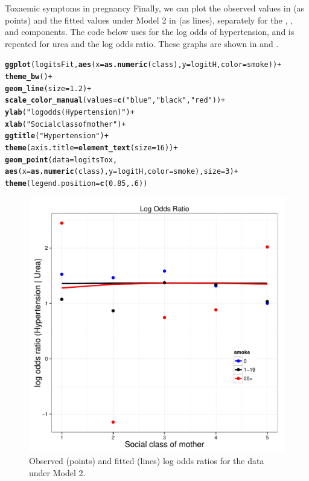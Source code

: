 \documentclass[11pt]{book}\usepackage[]{graphicx}\usepackage[]{color}
\makeatletter
\newcommand{\hlnum}[1]{\textcolor[rgb]{0.686,0.059,0.569}{#1}}%
\newcommand{\hlstr}[1]{\textcolor[rgb]{0.192,0.494,0.8}{#1}}%
\newcommand{\hlopt}[1]{\textcolor[rgb]{0,0,0}{#1}}%
\newcommand{\hlstd}[1]{\textcolor[rgb]{0.345,0.345,0.345}{#1}}%
\newcommand{\hlkwc}[1]{\textcolor[rgb]{0.333,0.667,0.333}{#1}}%
\newcommand{\hlkwd}[1]{\textcolor[rgb]{0.737,0.353,0.396}{\textbf{#1}}}%
\newenvironment{kframe}{%
 \def\at@end@of@kframe{}%
 \ifinner\ifhmode%
  \def\at@end@of@kframe{\end{minipage}}%
  \begin{minipage}{\columnwidth}%
 \fi\fi%
 \def\FrameCommand##1{\hskip\@totalleftmargin \hskip-\fboxsep
 \colorbox{shadecolor}{##1}\hskip-\fboxsep
     \hskip-\linewidth \hskip-\@totalleftmargin \hskip\columnwidth}%
 \MakeFramed {\advance\hsize-\width
   \@totalleftmargin\z@ \linewidth\hsize
   \@setminipage}}%
 {\par\unskip\endMakeFramed%
 \at@end@of@kframe}
\newenvironment{knitrout}{}{} %
\renewenvironment{knitrout}{\small\renewcommand{\baselinestretch}{.85}}{} %
\makeatother
\begin{document}
\begin{Example}[toxaemia]{Toxaemic symptoms in pregnancy}
Finally, we can plot the observed values in  (as points) and the
fitted values under Model 2 in  (as lines),
separately for the , , and  components.
The code below uses  for the log odds of hypertension,
and is repeated for urea and the log odds ratio.
These graphs are shown in  and .
\begin{knitrout}
\color{fgcolor}\begin{kframe}
\begin{alltt}
\hlkwd{ggplot}\hlstd{(logitsFit,} \hlkwd{aes}\hlstd{(}\hlkwc{x}\hlstd{=}\hlkwd{as.numeric}\hlstd{(class),} \hlkwc{y}\hlstd{=logitH,} \hlkwc{color}\hlstd{=smoke))} \hlopt{+}
  \hlkwd{theme_bw}\hlstd{()} \hlopt{+}
  \hlkwd{geom_line}\hlstd{(}\hlkwc{size}\hlstd{=}\hlnum{1.2}\hlstd{)} \hlopt{+}
  \hlkwd{scale_color_manual}\hlstd{(}\hlkwc{values}\hlstd{=}\hlkwd{c}\hlstd{(}\hlstr{"blue"}\hlstd{,} \hlstr{"black"}\hlstd{,} \hlstr{"red"}\hlstd{))} \hlopt{+}
  \hlkwd{ylab}\hlstd{(}\hlstr{"log odds (Hypertension)"}\hlstd{)} \hlopt{+}
  \hlkwd{xlab}\hlstd{(}\hlstr{"Social class of mother"}\hlstd{)} \hlopt{+}
  \hlkwd{ggtitle}\hlstd{(}\hlstr{"Hypertension"}\hlstd{)} \hlopt{+}
  \hlkwd{theme}\hlstd{(}\hlkwc{axis.title}\hlstd{=}\hlkwd{element_text}\hlstd{(}\hlkwc{size}\hlstd{=}\hlnum{16}\hlstd{))} \hlopt{+}
  \hlkwd{geom_point}\hlstd{(}\hlkwc{data}\hlstd{=logitsTox,}
             \hlkwd{aes}\hlstd{(}\hlkwc{x}\hlstd{=}\hlkwd{as.numeric}\hlstd{(class),} \hlkwc{y}\hlstd{=logitH,} \hlkwc{color}\hlstd{=smoke),} \hlkwc{size}\hlstd{=}\hlnum{3}\hlstd{)} \hlopt{+}
  \hlkwd{theme}\hlstd{(}\hlkwc{legend.position}\hlstd{=}\hlkwd{c}\hlstd{(}\hlnum{0.85}\hlstd{,} \hlnum{.6}\hlstd{))}
\end{alltt}
\end{kframe}
\end{knitrout}
\begin{figure}
\centering
\includegraphics[width=.49\textwidth]{ch08/fig/tox-glm-logits3}
\caption{Observed (points) and fitted (lines) log odds ratios for the  data under Model 2.}
\label{fig:tox-glm-logits3}
\end{figure}


\end{Example}
\end{document}
